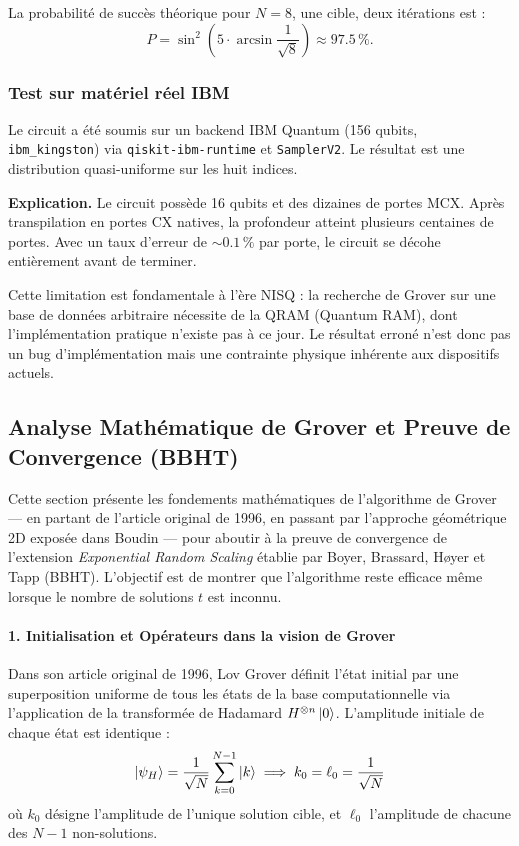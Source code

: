 \documentclass{ceri/sty/rapport}
\begin{document}
La probabilité de succès théorique pour $N=8$, une cible, deux itérations est :
\[
  P = \sin^2\!\left(5 \cdot \arcsin\frac{1}{\sqrt{8}}\right) \approx 97.5\,\%.
\]

\subsubsection{Test sur matériel réel IBM}

Le circuit a été soumis sur un backend IBM Quantum (156 qubits, \texttt{ibm\_kingston})
via \texttt{qiskit-ibm-runtime} et \texttt{SamplerV2}. Le résultat est une
distribution quasi-uniforme sur les huit indices.

\textbf{Explication.} Le circuit possède 16 qubits et des dizaines de portes MCX.
Après transpilation en portes CX natives, la profondeur atteint plusieurs centaines
de portes. Avec un taux d'erreur de $\sim 0.1\,\%$ par porte, le circuit se décohe
entièrement avant de terminer.

Cette limitation est fondamentale à l'ère NISQ : la recherche de Grover sur une
base de données arbitraire nécessite de la QRAM (Quantum RAM), dont l'implémentation
pratique n'existe pas à ce jour. Le résultat erroné n'est donc pas un bug
d'implémentation mais une contrainte physique inhérente aux dispositifs actuels.

\subsection{Analyse Mathématique de Grover et Preuve de Convergence (BBHT)}
\label{sec:bbht}

Cette section présente les fondements mathématiques de l'algorithme de Grover --- en partant de l'article original de 1996, en passant par l'approche géométrique 2D exposée dans Boudin --- pour aboutir à la preuve de convergence de l'extension \emph{Exponential Random Scaling} établie par Boyer, Brassard, Høyer et Tapp (BBHT). L'objectif est de montrer que l'algorithme reste efficace même lorsque le nombre de solutions $t$ est inconnu.

\paragraph{1. Initialisation et Opérateurs dans la vision de Grover}
Dans son article original de 1996, Lov Grover définit l'état initial par une superposition uniforme de tous les états de la base computationnelle via l'application de la transformée de Hadamard $H^{\otimes n}\ket{0}$. L'amplitude initiale de chaque état est identique :
\[
\ket{\psi_H} = \frac{1}{\sqrt{N}} \sum_{k=0}^{N-1} \ket{k} \implies k_0 = \ell_0 = \frac{1}{\sqrt{N}}
\]
où $k_0$ désigne l'amplitude de l'unique solution cible, et $\ell_0$ l'amplitude de chacune des $N-1$ non-solutions.
\end{document}
